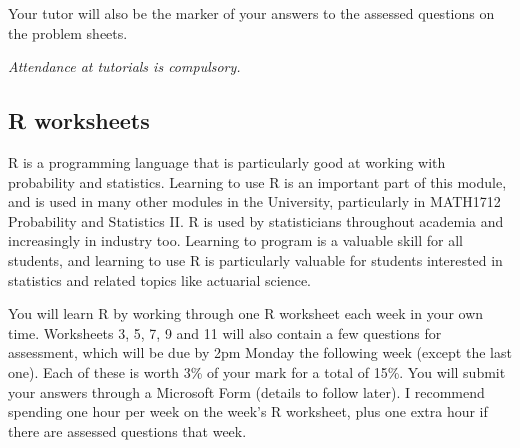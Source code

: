 \documentclass[
  a4paper,
]{book}
\theoremstyle{definition}
\theoremstyle{definition}
\theoremstyle{definition}
\theoremstyle{definition}
\theoremstyle{remark}
\begin{document}
Your tutor will also be the marker of your answers to the assessed questions on the problem sheets.

\emph{Attendance at tutorials is compulsory.}

\hypertarget{r-worksheets}{%
\subsection*{R worksheets}\label{r-worksheets}}

R is a programming language that is particularly good at working with probability and statistics. Learning to use R is an important part of this module, and is used in many other modules in the University, particularly in MATH1712 Probability and Statistics II. R is used by statisticians throughout academia and increasingly in industry too. Learning to program is a valuable skill for all students, and learning to use R is particularly valuable for students interested in statistics and related topics like actuarial science.

You will learn R by working through one R worksheet each week in your own time. Worksheets 3, 5, 7, 9 and 11 will also contain a few questions for assessment, which will be due by 2pm Monday the following week (except the last one). Each of these is worth 3\% of your mark for a total of 15\%. You will submit your answers through a Microsoft Form (details to follow later). I recommend spending one hour per week on the week's R worksheet, plus one extra hour if there are assessed questions that week.
\end{document}

